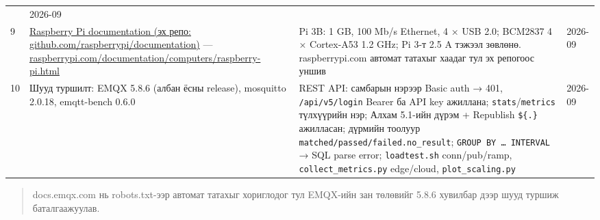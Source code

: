 \begin{longtable}[]{@{}llll@{}}
\begin{minipage}[t]{0.22\columnwidth}
\end{minipage} & \begin{minipage}[t]{0.22\columnwidth}\raggedright
2026-09\strut
\end{minipage}\tabularnewline
\begin{minipage}[t]{0.22\columnwidth}\raggedright
9\strut
\end{minipage} & \begin{minipage}[t]{0.22\columnwidth}\raggedright
\href{https://github.com/raspberrypi/documentation}{Raspberry Pi documentation (эх репо: github.\allowbreak{}com/\allowbreak{}raspberrypi/\allowbreak{}documentation)} --- \href{https://www.raspberrypi.com/documentation/computers/raspberry-pi.html}{raspberrypi.\allowbreak{}com/\allowbreak{}documentation/\allowbreak{}computers/\allowbreak{}raspberry-pi.\allowbreak{}html}\strut
\end{minipage} & \begin{minipage}[t]{0.22\columnwidth}\raggedright
Pi 3B: 1 GB, 100 Mb/s Ethernet, 4 × USB 2.0; BCM2837 4 × Cortex-A53 1.2 GHz; Pi 3-т 2.5 A тэжээл зөвлөнө. raspberrypi.com автомат татахыг хаадаг тул эх репогоос уншив\strut
\end{minipage} & \begin{minipage}[t]{0.22\columnwidth}\raggedright
2026-09\strut
\end{minipage}\tabularnewline
\begin{minipage}[t]{0.22\columnwidth}\raggedright
10\strut
\end{minipage} & \begin{minipage}[t]{0.22\columnwidth}\raggedright
Шууд туршилт: EMQX 5.8.6 (албан ёсны release), mosquitto 2.0.18, emqtt-bench 0.6.0\strut
\end{minipage} & \begin{minipage}[t]{0.22\columnwidth}\raggedright
REST API: самбарын нэрээр Basic auth → 401, \texttt{/api/v5/login} Bearer ба API key ажиллана; \texttt{stats}/\allowbreak\texttt{metrics} түлхүүрийн нэр; Алхам 5.1-ийн дүрэм + Republish \texttt{\$\{.\}} ажилласан; дүрмийн тоолуур \texttt{matched/\allowbreak{}passed/\allowbreak{}failed.\allowbreak{}no\_\allowbreak{}result}; \texttt{GROUP\ BY\ \ldots{}\ INTERVAL} → SQL parse error; \texttt{loadtest.sh} conn/pub/ramp, \texttt{collect\_\allowbreak{}metrics.\allowbreak{}py} edge/cloud, \texttt{plot\_scaling.py}\strut
\end{minipage} & \begin{minipage}[t]{0.22\columnwidth}\raggedright
2026-09\strut
\end{minipage}\tabularnewline
\bottomrule
\end{longtable}\endgroup

\begin{quote}
docs.emqx.com нь robots.txt-ээр автомат татахыг хориглодог тул EMQX-ийн зан төлөвийг 5.8.6 хувилбар дээр шууд туршиж баталгаажуулав.
\end{quote}
